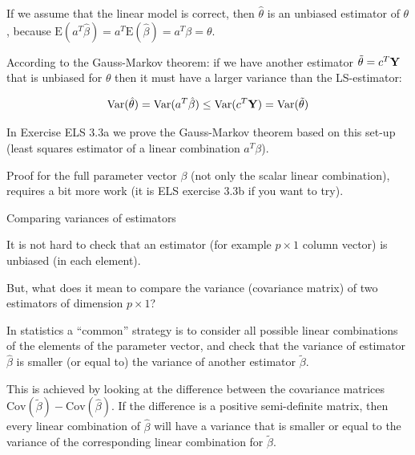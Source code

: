 \documentclass[
  ignorenonframetext,
]{beamer}
\begin{document}
\begin{frame}

If we assume that the linear model is correct, then \(\hat{\theta}\) is
an unbiased estimator of \(\theta\), because
\(\text{E}(a^T \hat{\beta})=a^T \text{E}(\hat{\beta})=a^T\beta=\theta\).

According to the Gauss-Markov theorem: if we have another estimator
\(\tilde{\theta}=c^T{\bf Y}\) that is unbiased for \(\theta\) then it
must have a larger variance than the LS-estimator:

\[\text{Var}(\hat{\theta})=\text{Var}(a^T \hat{\beta})\le \text{Var}(c^T{\bf Y})=\text{Var}(\tilde{\theta})\]

\end{frame}

\begin{frame}

In Exercise ELS 3.3a we prove the Gauss-Markov theorem based on this
set-up (least squares estimator of a linear combination \(a^T\beta\)).

Proof for the full parameter vector \(\beta\) (not only the scalar
linear combination), requires a bit more work (it is ELS exercise 3.3b
if you want to try).

\end{frame}

\begin{frame}

\begin{block}{Comparing variances of estimators}

It is not hard to check that an estimator (for example \(p\times 1\)
column vector) is unbiased (in each element).

But, what does it mean to compare the variance (covariance matrix) of
two estimators of dimension \(p \times 1\)?

\end{block}

\end{frame}

\begin{frame}

In statistics a ``common'' strategy is to consider all possible linear
combinations of the elements of the parameter vector, and check that the
variance of estimator \(\hat{\beta}\) is smaller (or equal to) the
variance of another estimator \(\tilde{\beta}\).

\end{frame}

\begin{frame}

This is achieved by looking at the difference between the covariance
matrices \(\text{Cov}(\tilde{\beta})-\text{Cov}(\hat{\beta})\). If the
difference is a positive semi-definite matrix, then every linear
combination of \(\hat{\beta}\) will have a variance that is smaller or
equal to the variance of the corresponding linear combination for
\(\tilde{\beta}\).

\end{frame}
\end{document}

